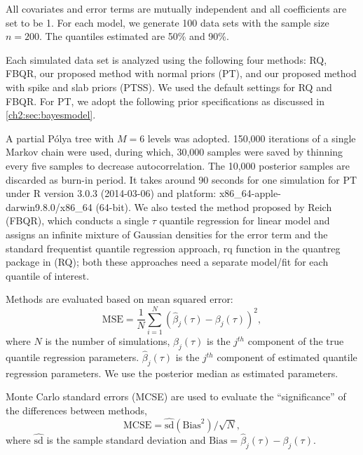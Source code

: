 \documentclass[12pt]{article}
\newcommand{\polya}{P\'{o}lya}
\begin{document}
All covariates and error terms are mutually independent and all coefficients are set to be 1.
For each model, we generate 100 data sets with the sample size $n=200$.
The quantiles estimated are 50\% and 90\%.

Each simulated data set is analyzed using the following four methods:
RQ, FBQR, our proposed method with normal priors (PT), and our proposed method with spike and slab priors (PTSS).
We used the default settings for RQ and FBQR.
For PT, we adopt the following prior specifications as discussed in \ref{ch2:sec:bayesmodel}.

A partial \polya{} tree with $M=6$ levels was adopted.
150,000 iterations of a single Markov chain were used,
during which, 30,000 samples were saved by thinning every five samples to decrease autocorrelation.
The 10,000 posterior samples are discarded as burn-in period.
It takes around 90 seconds for one simulation for PT under R version 3.0.3 (2014-03-06) and platform: x86\_64-apple-darwin9.8.0/x86\_64 (64-bit).
We also tested the method proposed by Reich (FBQR), which conducts a single $\tau$ quantile regression for linear model and assigns an infinite mixture of Gaussian densities for the error term and the standard frequentist quantile regression approach,
rq function in the quantreg package \citep{quantreg} in \cite{R} (RQ);
both these approaches need a separate model/fit for each quantile of interest.

Methods are evaluated based on mean squared error:
\begin{displaymath}
  \mbox{MSE}  =  \frac{1}{N}\sum_{i = 1}^N (\hat{\beta}_j(\tau) -
  \beta_j(\tau))^2 ,
\end{displaymath}
where $N$ is the number of simulations, $\beta_j(\tau)$ is the $j^{th}$ component of the true quantile regression parameters.
$\hat{\beta}_j(\tau)$ is the $j^{th}$ component of estimated quantile regression parameters.
We use the posterior median as estimated parameters.

Monte Carlo standard errors (MCSE) are used to evaluate the ``significance'' of the differences between methods,
\begin{displaymath}
  \mbox{MCSE} = \widehat{\mbox{sd}}(\mbox{Bias}^2)/\sqrt{N},
\end{displaymath}
where $\widehat{\mbox{sd}}$ is the sample standard deviation and $\mbox{Bias} = \hat{\beta}_{j}(\tau) - \beta_{j}(\tau)$.
\end{document}
